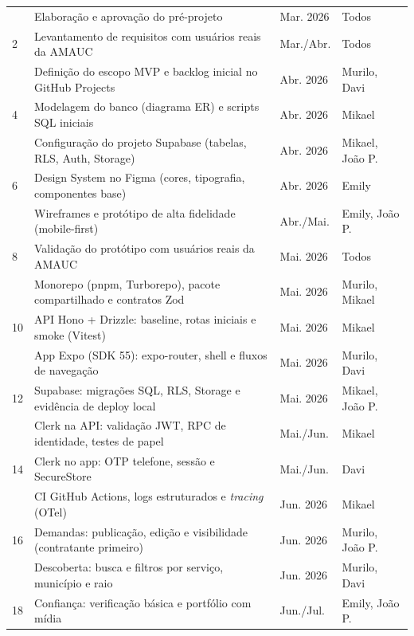 \documentclass[12pt, a4paper]{article}
\begin{document}
\begin{longtable}{%
  >{\centering\arraybackslash}p{0.7cm}
  p{7.2cm}
  p{3.4cm}
  >{\centering\arraybackslash}p{1.4cm}}
  1  & Elaboração e aprovação do pré-projeto
     & Mar. 2026 & Todos \\
  \rowcolor{rowGray}
  2  & Levantamento de requisitos com usuários reais da AMAUC
     & Mar./Abr. & Todos \\
  3  & Definição do escopo MVP e backlog inicial no GitHub Projects
     & Abr. 2026 & Murilo, Davi \\
  \rowcolor{rowGray}
  4  & Modelagem do banco (diagrama ER) e scripts SQL iniciais
     & Abr. 2026 & Mikael \\
  5  & Configuração do projeto Supabase (tabelas, RLS, Auth, Storage)
     & Abr. 2026 & Mikael, João P. \\
  \rowcolor{rowGray}
  6  & Design System no Figma (cores, tipografia, componentes base)
     & Abr. 2026 & Emily \\
  7  & Wireframes e protótipo de alta fidelidade (mobile-first)
     & Abr./Mai. & Emily, João P. \\
  \rowcolor{rowGray}
  8  & Validação do protótipo com usuários reais da AMAUC
     & Mai. 2026 & Todos \\
  9  & Monorepo (pnpm, Turborepo), pacote compartilhado e contratos Zod
     & Mai. 2026 & Murilo, Mikael \\
  \rowcolor{rowGray}
  10 & API Hono + Drizzle: baseline, rotas iniciais e smoke (Vitest)
     & Mai. 2026 & Mikael \\
  11 & App Expo (SDK 55): expo-router, shell e fluxos de navegação
     & Mai. 2026 & Murilo, Davi \\
  \rowcolor{rowGray}
  12 & Supabase: migrações SQL, RLS, Storage e evidência de deploy local
     & Mai. 2026 & Mikael, João P. \\
  13 & Clerk na API: validação JWT, RPC de identidade, testes de papel
     & Mai./Jun. & Mikael \\
  \rowcolor{rowGray}
  14 & Clerk no app: OTP telefone, sessão e SecureStore
     & Mai./Jun. & Davi \\
  15 & CI GitHub Actions, logs estruturados e \textit{tracing} (OTel)
     & Jun. 2026 & Mikael \\
  \rowcolor{rowGray}
  16 & Demandas: publicação, edição e visibilidade (contratante primeiro)
     & Jun. 2026 & Murilo, João P. \\
  17 & Descoberta: busca e filtros por serviço, município e raio
     & Jun. 2026 & Murilo, Davi \\
  \rowcolor{rowGray}
  18 & Confiança: verificação básica e portfólio com mídia
     & Jun./Jul. & Emily, João P. \\

\end{longtable}
\end{document}
